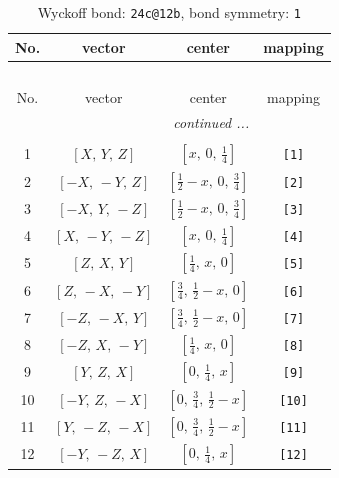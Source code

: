 \documentclass[fleqn,8pt]{jsarticle}
\begin{document}
\begin{longtable}{cccc}
\caption{Wyckoff bond: {\tt 24c@12b}, bond symmetry: {\tt 1}}
 \\
 \hline \hline
No. & vector & center & mapping \\ \hline \endfirsthead

\multicolumn{3}{l}{\tablename\ \thetable{}} \\
 \hline \hline
No. & vector & center & mapping \\ \hline \endhead

 \hline \hline
\multicolumn{3}{r}{\footnotesize\it continued ...} \\ \endfoot

 \hline \hline
\multicolumn{3}{r}{} \\ \endlastfoot

1 & $\left[ X,\, Y,\, Z \right]$ & $\left[ x,\, 0,\, \frac{1}{4} \right]$ & {\tt [1]} \\ \hline
2 & $\left[ - X,\, - Y,\, Z \right]$ & $\left[ \frac{1}{2} - x,\, 0,\, \frac{3}{4} \right]$ & {\tt [2]} \\ \hline
3 & $\left[ - X,\, Y,\, - Z \right]$ & $\left[ \frac{1}{2} - x,\, 0,\, \frac{3}{4} \right]$ & {\tt [3]} \\ \hline
4 & $\left[ X,\, - Y,\, - Z \right]$ & $\left[ x,\, 0,\, \frac{1}{4} \right]$ & {\tt [4]} \\ \hline
5 & $\left[ Z,\, X,\, Y \right]$ & $\left[ \frac{1}{4},\, x,\, 0 \right]$ & {\tt [5]} \\ \hline
6 & $\left[ Z,\, - X,\, - Y \right]$ & $\left[ \frac{3}{4},\, \frac{1}{2} - x,\, 0 \right]$ & {\tt [6]} \\ \hline
7 & $\left[ - Z,\, - X,\, Y \right]$ & $\left[ \frac{3}{4},\, \frac{1}{2} - x,\, 0 \right]$ & {\tt [7]} \\ \hline
8 & $\left[ - Z,\, X,\, - Y \right]$ & $\left[ \frac{1}{4},\, x,\, 0 \right]$ & {\tt [8]} \\ \hline
9 & $\left[ Y,\, Z,\, X \right]$ & $\left[ 0,\, \frac{1}{4},\, x \right]$ & {\tt [9]} \\ \hline
10 & $\left[ - Y,\, Z,\, - X \right]$ & $\left[ 0,\, \frac{3}{4},\, \frac{1}{2} - x \right]$ & {\tt [10]} \\ \hline
11 & $\left[ Y,\, - Z,\, - X \right]$ & $\left[ 0,\, \frac{3}{4},\, \frac{1}{2} - x \right]$ & {\tt [11]} \\ \hline
12 & $\left[ - Y,\, - Z,\, X \right]$ & $\left[ 0,\, \frac{1}{4},\, x \right]$ & {\tt [12]} \\
\end{longtable}
\end{document}
